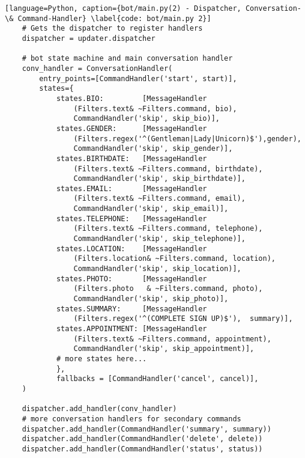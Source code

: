        \begin{lstlisting}[language=Python, caption={bot/main.py(2) - Dispatcher, Conversation- \& Command-Handler} \label{code: bot/main.py 2}]
    # Gets the dispatcher to register handlers
    dispatcher = updater.dispatcher
    
    # bot state machine and main conversation handler
    conv_handler = ConversationHandler(
        entry_points=[CommandHandler('start', start)],
        states={
            states.BIO:         [MessageHandler
                (Filters.text& ~Filters.command, bio), 
                CommandHandler('skip', skip_bio)],
            states.GENDER:      [MessageHandler
                (Filters.regex('^(Gentleman|Lady|Unicorn)$'),gender), 
                CommandHandler('skip', skip_gender)],
            states.BIRTHDATE:   [MessageHandler
                (Filters.text& ~Filters.command, birthdate), 
                CommandHandler('skip', skip_birthdate)],
            states.EMAIL:       [MessageHandler
                (Filters.text& ~Filters.command, email), 
                CommandHandler('skip', skip_email)],
            states.TELEPHONE:   [MessageHandler
                (Filters.text& ~Filters.command, telephone), 
                CommandHandler('skip', skip_telephone)],
            states.LOCATION:    [MessageHandler
                (Filters.location& ~Filters.command, location), 
                CommandHandler('skip', skip_location)],
            states.PHOTO:       [MessageHandler
                (Filters.photo   & ~Filters.command, photo), 
                CommandHandler('skip', skip_photo)],
            states.SUMMARY:     [MessageHandler
                (Filters.regex('^(COMPLETE SIGN UP)$'),  summary)],
            states.APPOINTMENT: [MessageHandler
                (Filters.text& ~Filters.command, appointment), 
                CommandHandler('skip', skip_appointment)],
            # more states here...
            },
            fallbacks = [CommandHandler('cancel', cancel)],
    )

    dispatcher.add_handler(conv_handler)
    # more conversation handlers for secondary commands
    dispatcher.add_handler(CommandHandler('summary', summary))
    dispatcher.add_handler(CommandHandler('delete', delete))
    dispatcher.add_handler(CommandHandler('status', status))
        \end{lstlisting}

